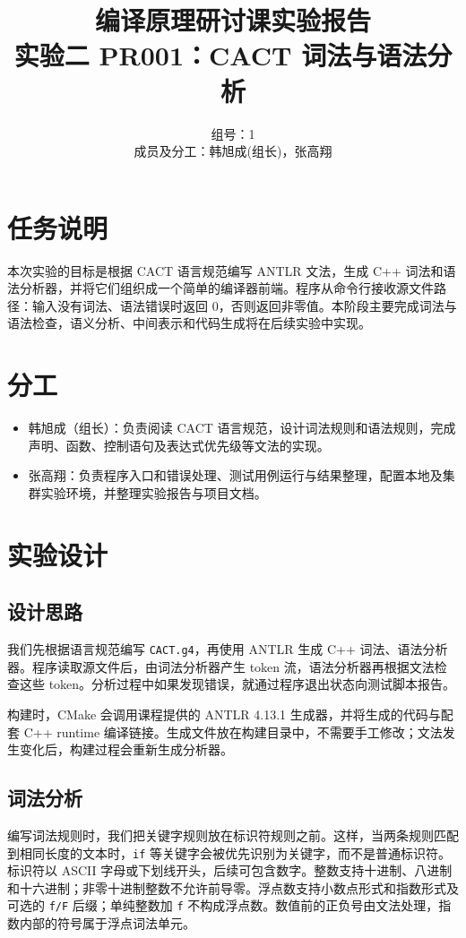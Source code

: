 \documentclass[UTF8,a4paper,11pt]{ctexart}
\title{编译原理研讨课实验报告\\[0.4em]\large 实验二 PR001：CACT 词法与语法分析}
\author{组号：1\\成员及分工：韩旭成(组长)，张高翔}
\date{}
\begin{document}
\maketitle
\section{任务说明}
本次实验的目标是根据 CACT 语言规范编写 ANTLR 文法，生成 C++ 词法和语法分析器，并将它们组织成一个简单的编译器前端。程序从命令行接收源文件路径：输入没有词法、语法错误时返回 0，否则返回非零值。本阶段主要完成词法与语法检查，语义分析、中间表示和代码生成将在后续实验中实现。

\section{分工}
\begin{itemize}[leftmargin=2em]
  \item 韩旭成（组长）：负责阅读 CACT 语言规范，设计词法规则和语法规则，完成声明、函数、控制语句及表达式优先级等文法的实现。
  \item 张高翔：负责程序入口和错误处理、测试用例运行与结果整理，配置本地及集群实验环境，并整理实验报告与项目文档。
\end{itemize}

\section{实验设计}
\subsection{设计思路}
我们先根据语言规范编写 \texttt{CACT.g4}，再使用 ANTLR 生成 C++ 词法、语法分析器。程序读取源文件后，由词法分析器产生 token 流，语法分析器再根据文法检查这些 token。分析过程中如果发现错误，就通过程序退出状态向测试脚本报告。

构建时，CMake 会调用课程提供的 ANTLR 4.13.1 生成器，并将生成的代码与配套 C++ runtime 编译链接。生成文件放在构建目录中，不需要手工修改；文法发生变化后，构建过程会重新生成分析器。

\subsection{词法分析}
编写词法规则时，我们把关键字规则放在标识符规则之前。这样，当两条规则匹配到相同长度的文本时，\texttt{if} 等关键字会被优先识别为关键字，而不是普通标识符。标识符以 ASCII 字母或下划线开头，后续可包含数字。整数支持十进制、八进制和十六进制；非零十进制整数不允许前导零。浮点数支持小数点形式和指数形式及可选的 \texttt{f/F} 后缀；单纯整数加 \texttt{f} 不构成浮点数。数值前的正负号由文法处理，指数内部的符号属于浮点词法单元。
\end{document}
